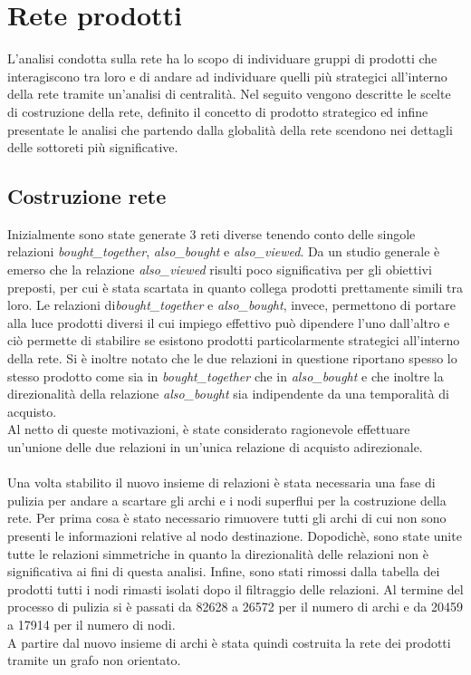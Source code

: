 \section{Rete prodotti}\label{ReteProdotti}
L'analisi condotta sulla rete ha lo scopo di individuare gruppi di prodotti che interagiscono tra loro e di andare ad individuare quelli più strategici all'interno della rete tramite un'analisi di centralità. Nel seguito vengono descritte le scelte di costruzione della rete, definito il concetto di prodotto strategico ed infine presentate le analisi che partendo dalla globalità della rete scendono nei dettagli delle sottoreti più significative. 

\subsection{Costruzione rete}
Inizialmente sono state generate 3 reti diverse tenendo conto delle singole relazioni \textit{bought\_together}, \textit{also\_bought} e \textit{also\_viewed}. Da un studio generale è emerso che la relazione \textit{also\_viewed} risulti poco significativa per gli obiettivi preposti, per cui è stata scartata in quanto collega prodotti prettamente simili tra loro. Le relazioni di\textit{bought\_together} e \textit{also\_bought}, invece, permettono di portare alla luce prodotti diversi il cui impiego effettivo può dipendere l'uno dall'altro e ciò permette di stabilire se esistono prodotti particolarmente strategici all'interno della rete. Si è inoltre notato che le due relazioni in questione riportano spesso lo stesso prodotto come sia in \textit{bought\_together} che in \textit{also\_bought} e che inoltre la direzionalità della relazione \textit{also\_bought} sia indipendente da una temporalità di acquisto. \\
Al netto di queste motivazioni, è state considerato ragionevole effettuare un'unione delle due relazioni in un'unica relazione di acquisto adirezionale. 
\\\\
Una volta stabilito il nuovo insieme di relazioni è stata necessaria una fase di pulizia per andare a scartare gli archi e i nodi superflui per la costruzione della rete. Per prima cosa è stato necessario rimuovere tutti gli archi di cui non sono presenti le informazioni relative al nodo destinazione. Dopodichè, sono state unite tutte le relazioni simmetriche in quanto la direzionalità delle relazioni non è significativa ai fini di questa analisi. Infine, sono stati rimossi dalla tabella dei prodotti tutti i nodi rimasti isolati dopo il filtraggio delle relazioni. Al termine del processo di pulizia si è passati da 82628 a 26572 per il numero di archi e da 20459 a 17914 per il numero di nodi. \\
A partire dal nuovo insieme di archi è stata quindi costruita la rete dei prodotti tramite un grafo non orientato.



